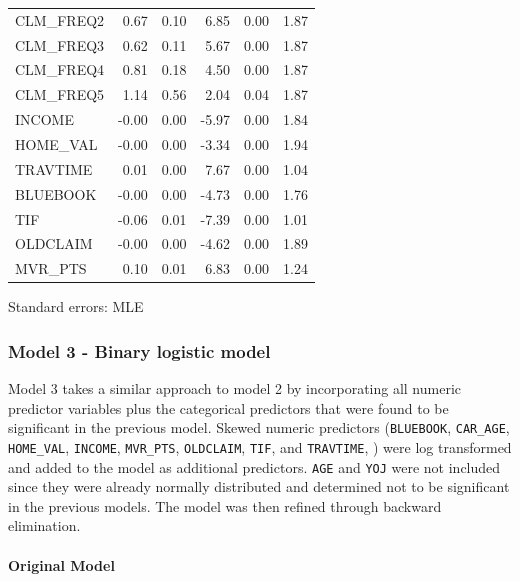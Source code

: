 \documentclass[]{article}
\let\oldparagraph\paragraph
\renewcommand{\paragraph}[1]{\oldparagraph{#1}\mbox{}}
\begin{document}
\begin{table}[!h]
\begin{threeparttable}
\begin{tabular}{lrrrrr}
CLM\_FREQ2 & 0.67 & 0.10 & 6.85 & 0.00 & 1.87\\
\rowcolor{gray!6}  CLM\_FREQ3 & 0.62 & 0.11 & 5.67 & 0.00 & 1.87\\
\addlinespace
CLM\_FREQ4 & 0.81 & 0.18 & 4.50 & 0.00 & 1.87\\
\rowcolor{gray!6}  CLM\_FREQ5 & 1.14 & 0.56 & 2.04 & 0.04 & 1.87\\
INCOME & -0.00 & 0.00 & -5.97 & 0.00 & 1.84\\
\rowcolor{gray!6}  HOME\_VAL & -0.00 & 0.00 & -3.34 & 0.00 & 1.94\\
TRAVTIME & 0.01 & 0.00 & 7.67 & 0.00 & 1.04\\
\addlinespace
\rowcolor{gray!6}  BLUEBOOK & -0.00 & 0.00 & -4.73 & 0.00 & 1.76\\
TIF & -0.06 & 0.01 & -7.39 & 0.00 & 1.01\\
\rowcolor{gray!6}  OLDCLAIM & -0.00 & 0.00 & -4.62 & 0.00 & 1.89\\
MVR\_PTS & 0.10 & 0.01 & 6.83 & 0.00 & 1.24\\
\bottomrule
\end{tabular}
\begin{tablenotes}
\item Standard errors: MLE
\end{tablenotes}
\end{threeparttable}
\end{table}

\newpage

\subsubsection{Model 3 - Binary logistic
model}\label{model-3---binary-logistic-model}

Model 3 takes a similar approach to model 2 by incorporating all numeric
predictor variables plus the categorical predictors that were found to
be significant in the previous model. Skewed numeric predictors
(\texttt{BLUEBOOK}, \texttt{CAR\_AGE}, \texttt{HOME\_VAL},
\texttt{INCOME}, \texttt{MVR\_PTS}, \texttt{OLDCLAIM}, \texttt{TIF}, and
\texttt{TRAVTIME}, ) were log transformed and added to the model as
additional predictors. \texttt{AGE} and \texttt{YOJ} were not included
since they were already normally distributed and determined not to be
significant in the previous models. The model was then refined through
backward elimination.

\paragraph{Original Model}\label{original-model}
\end{document}

